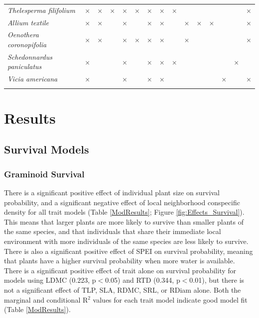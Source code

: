 \documentclass[12pt, letterpaper]{article}
\begin{document}
\begin{table}[h]
{\begin{tabular} {lccccccc|ccccc|cc}
\textit{Thelesperma filifolium} & $\times$ & $\times$ & $\times$ & $\times$ & $\times$ & $\times$ & $\times$ & $\times$ &&&&&&$\times$\\ 
\rowcolor[gray]{.95}\textit{Allium textile} & $\times$ & $\times$ &  & $\times$ &  & $\times$ & $\times$ &  & $\times$ &$\times$&$\times$&&&$\times$\\ 
\textit{Oenothera coronopifolia} & $\times$ & $\times$ &  & $\times$ & $\times$ & $\times$ & $\times$ & &$\times$ &&&&&$\times$\\ 
\rowcolor[gray]{.95}\textit{Schedonnardus paniculatus} & $\times$ &  & & $\times$ &  & $\times$ & $\times$ & $\times$ &&&&&$\times$&\\ 
\textit{Vicia americana} & $\times$ & & & $\times$ & & $\times$ & $\times$ & &&&&$\times$&&$\times$\\
\hline \\[-1.8ex] 
\end{tabular}}
\end{table}

\section{Results}
\subsection{Survival Models} 
\subsubsection{Graminoid Survival}
There is a significant positive effect of individual plant size on survival probability, and a significant negative effect of local neighborhood conspecific density for all trait models (Table \ref{ModResults}; Figure \ref{fig:Effects_Survival}). This means that larger plants are more likely to survive than smaller plants of the same species, and that individuals that share their immediate local environment with more individuals of the same species are less likely to survive. There is also a significant positive effect of SPEI on survival probability, meaning that plants have a higher survival probability when more water is available. There is a significant positive effect of trait alone on survival probability for models using LDMC (0.223, p$<$0.05) and RTD (0.344, p$<$0.01), but there is not a significant effect of TLP, SLA, RDMC, SRL, or RDiam alone. Both the marginal and conditional R$^2$ values for each trait model indicate good model fit (Table \ref{ModResults}). 
\end{document}
